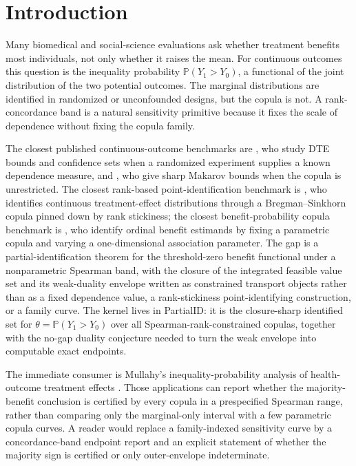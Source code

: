 \documentclass[11pt]{article}
\renewcommand{\Pr}{\mathbb{P}}
\theoremstyle{definition}
\theoremstyle{plain}
\theoremstyle{remark}
\begin{document}
\section{Introduction}
Many biomedical and social-science evaluations ask whether treatment benefits most individuals, not only whether it raises the mean.  For continuous outcomes this question is the inequality probability \(\Pr(Y_1>Y_0)\), a functional of the joint distribution of the two potential outcomes.  The marginal distributions are identified in randomized or unconfounded designs, but the copula is not.  A rank-concordance band is a natural sensitivity primitive because it fixes the scale of dependence without fixing the copula family.

The closest published continuous-outcome benchmarks are \citet[pp.~3--70]{FanPark2009DTEConfidenceSets}, who study DTE bounds and confidence sets when a randomized experiment supplies a known dependence measure, and \citet[pp.~931--951]{FanPark2010DTEBounds}, who give sharp Makarov bounds when the copula is unrestricted.  The closest rank-based point-identification benchmark is \citet{Liang2026RankStickiness}, who identifies continuous treatment-effect distributions through a Bregman--Sinkhorn copula pinned down by rank stickiness; the closest benefit-probability copula benchmark is \citet{HeLi2026OrdinalCopula}, who identify ordinal benefit estimands by fixing a parametric copula and varying a one-dimensional association parameter.  The gap is a partial-identification theorem for the threshold-zero benefit functional under a nonparametric Spearman band, with the closure of the integrated feasible value set and its weak-duality envelope written as constrained transport objects rather than as a fixed dependence value, a rank-stickiness point-identifying construction, or a family curve.  The kernel lives in PartialID: it is the closure-sharp identified set for \(\theta=\Pr(Y_1>Y_0)\) over all Spearman-rank-constrained copulas, together with the no-gap duality conjecture needed to turn the weak envelope into computable exact endpoints.

The immediate consumer is Mullahy's inequality-probability analysis of health-outcome treatment effects \citep{Mullahy2018InequalityProbability}.  Those applications can report whether the majority-benefit conclusion is certified by every copula in a prespecified Spearman range, rather than comparing only the marginal-only interval with a few parametric copula curves.  A reader would replace a family-indexed sensitivity curve by a concordance-band endpoint report and an explicit statement of whether the majority sign is certified or only outer-envelope indeterminate.
\end{document}
